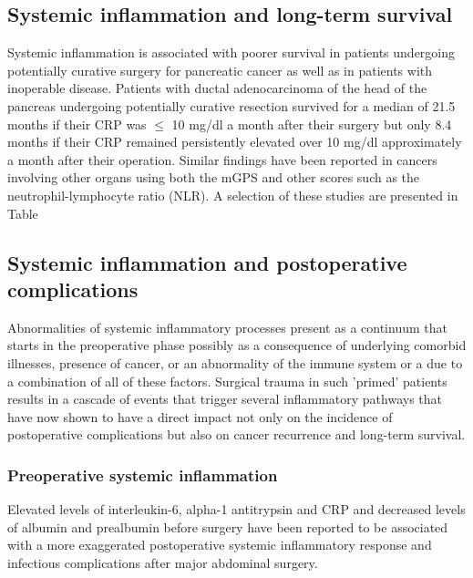 \subsection{Systemic inflammation and long-term survival}
Systemic inflammation is associated with poorer survival in patients undergoing potentially curative surgery for pancreatic cancer \parencite{jamieson_systemic_2005,clark_preoperative_2007,bhatti_preoperative_2010} as well as in patients with inoperable disease.\parencite{glen_evaluation_2006} Patients with ductal adenocarcinoma of the head of the pancreas undergoing potentially curative resection survived for a median of 21.5 months if their CRP was $\leq$ 10 mg/dl a month after their surgery but only 8.4 months if their CRP remained persistently elevated over 10 mg/dl approximately a month after their operation.\parencite{jamieson_systemic_2005} Similar findings have been reported in cancers involving other organs using both the mGPS and other scores such as the neutrophil-lymphocyte ratio (NLR). A selection of these studies are presented in Table %

\subsection{Systemic inflammation and postoperative complications}

Abnormalities of systemic inflammatory processes present as a continuum that starts in the preoperative phase possibly as a consequence of underlying comorbid illnesses, presence of cancer, or an abnormality of the immune system or a due to a combination of all of these factors. Surgical trauma in such 'primed' patients results in a cascade of events that trigger several inflammatory pathways that have now shown to have a direct impact not only on the incidence of postoperative complications but also on cancer recurrence and long-term survival.

\subsubsection{Preoperative systemic inflammation}
Elevated levels of interleukin-6, alpha-1 antitrypsin and CRP and decreased levels of albumin and prealbumin before surgery have been reported to be associated with a more exaggerated postoperative systemic inflammatory response and infectious complications after major abdominal surgery.\parencite{haupt_association_1997}

